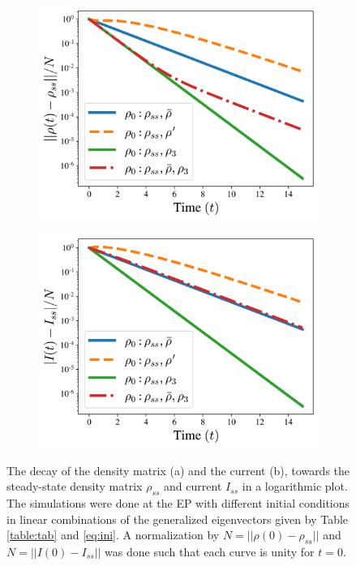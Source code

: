 \documentclass[../main.tex]{subfiles}
\begin{document}
\begin{figure}[H]
\centering
\begin{subfigure}[t]{.5\textwidth}
  \centering
  \includegraphics[width=\linewidth]{figures/rho_diff_rho0_v4.png}
  \caption{}
  \label{fig:rhodiffrho0}
\end{subfigure}%
\begin{subfigure}[t]{.5\textwidth}
  \centering
  \includegraphics[width=\linewidth]{figures/I_diff_rho0_nonvis.png}
  \caption{}
  \label{fig:Idiffrho0}
\end{subfigure}
\caption{The decay of the density matrix (a) and the current (b), towards the steady-state density matrix $\rho_{ss}$ and current $I_{ss}$ in a logarithmic plot. The simulations were done at the EP with different initial conditions in linear combinations of the generalized eigenvectors given by Table \ref{table:tab} and \cref{eq:ini}. A normalization by $N=||\rho(0) - \rho_{ss}||$ and $N=||I(0) - I_{ss}||$ was done such that each curve is unity for $t=0$.}
\label{fig:diffrho}
\end{figure}
\end{document}
